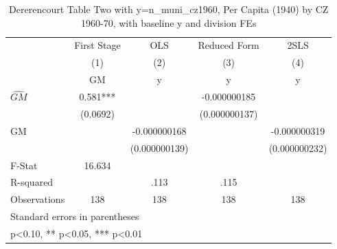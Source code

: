 \begin{table}[htbp]\centering
\def\sym#1{\ifmmode^{#1}\else\(^{#1}\)\fi}
\caption{Dererencourt Table Two with y=n\_muni\_cz1960, Per Capita (1940) by CZ 1960-70, with baseline y and division FEs}
\begin{tabular}{l*{4}{c}}
\toprule
                    & First Stage   &         OLS   &Reduced Form   &        2SLS   \\
                    &\multicolumn{1}{c}{(1)}&\multicolumn{1}{c}{(2)}&\multicolumn{1}{c}{(3)}&\multicolumn{1}{c}{(4)}\\
                    &\multicolumn{1}{c}{GM}&\multicolumn{1}{c}{y}&\multicolumn{1}{c}{y}&\multicolumn{1}{c}{y}\\
\midrule
$\hat{GM}$          &       0.581***&               &-0.000000185   &               \\
                    &    (0.0692)   &               &(0.000000137)   &               \\
\addlinespace
GM                  &               &-0.000000168   &               &-0.000000319   \\
                    &               &(0.000000139)   &               &(0.000000232)   \\
\midrule
F-Stat              &      16.634   &               &               &               \\
R-squared           &               &        .113   &        .115   &               \\
Observations        &         138   &         138   &         138   &         138   \\
\bottomrule
\multicolumn{5}{l}{\footnotesize Standard errors in parentheses}\\
\multicolumn{5}{l}{\footnotesize * p<0.10, ** p<0.05, *** p<0.01}\\
\end{tabular}
\end{table}
